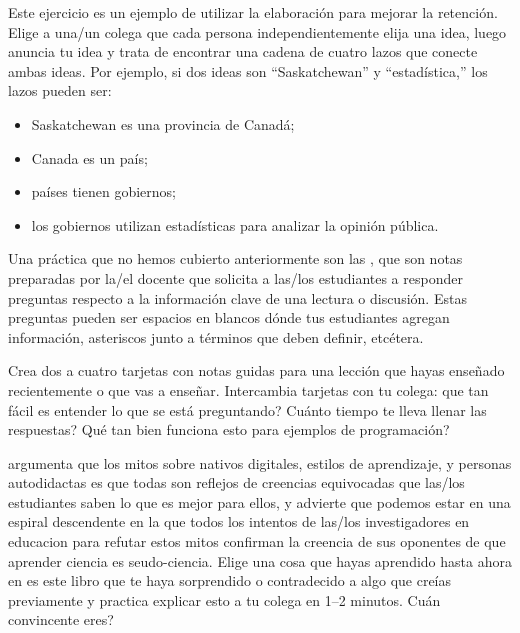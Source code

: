
Este ejercicio es un ejemplo de utilizar la elaboración para mejorar la retención.
Elige a una/un colega
que cada persona independientemente elija una idea,
luego anuncia tu idea y trata de encontrar una cadena de cuatro lazos
que conecte ambas ideas.
Por ejemplo,
si dos ideas son ``Saskatchewan'' y ``estadística,''
los lazos pueden ser:

\begin{itemize}

\item
  Saskatchewan es una provincia de Canadá;

\item
  Canada es un país;

\item
  países tienen gobiernos;

\item
  los gobiernos utilizan estadísticas para analizar la opinión pública.

\end{itemize}


Una práctica que no hemos cubierto anteriormente son las ,
que son notas preparadas por la/el docente
que solicita a las/los estudiantes a responder preguntas respecto a la información clave de una lectura o discusión.
Estas preguntas pueden ser espacios en blancos dónde tus estudiantes agregan información,
asteriscos junto a términos que deben definir,
etcétera.

Crea dos a cuatro tarjetas con notas guidas para una lección que hayas enseñado recientemente
o que vas a enseñar.
Intercambia tarjetas con tu colega:
que tan fácil es entender lo que se está preguntando?
Cuánto tiempo te lleva llenar las respuestas?
Qué tan bien funciona esto para ejemplos de programación?


\cite{Kirs2013} argumenta que los mitos sobre nativos digitales,
estilos de aprendizaje,
y personas autodidactas es que todas son reflejos de creencias equivocadas que
las/los estudiantes saben lo que es mejor para ellos,
y advierte que podemos estar en una espiral descendente
en la que todos los intentos de las/los investigadores en educacion para refutar estos mitos
confirman la creencia de sus oponentes de que aprender ciencia es seudo-ciencia.
Elige una cosa que hayas aprendido hasta ahora en es este libro
que te haya sorprendido o contradecido a algo que creías previamente
y practica explicar esto a tu colega en 1--2 minutos.
Cuán convincente eres?

